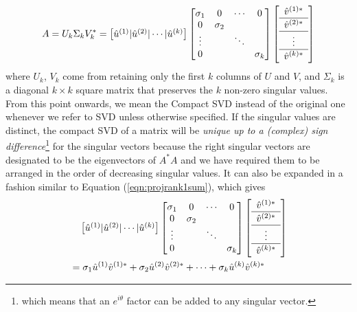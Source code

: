 \begin{align}
A = U_k\Sigma_k V_k^* = \begin{bmatrix}
\hat{u}^{(1)} | \hat{u}^{(2)} | \cdots | \hat{u}^{(k)}
\end{bmatrix}
\begin{bmatrix}
\sigma_1 & 0 & \cdots & 0 \\
0 & \sigma_2 & & \\
\vdots & & \ddots & \\
0 & & & \sigma_k
\end{bmatrix}
\left[\begin{array}{c} 
\hat{v}^{(1)*} \\
\hline
\hat{v}^{(2)*} \Tstrut \\
\hline
\vdots \\
\hline 
\hat{v}^{(k)*} \Tstrut 
\end{array}\right] 
\end{align}
where $U_k$, $V_k$ come from retaining only the first $k$ columns of $U$ and $V$, and $\Sigma_k$ is a diagonal $k \times k$ square matrix that preserves the $k$ non-zero singular values. From this point onwards, we mean the Compact SVD instead of the original one whenever we refer to SVD unless otherwise specified. If the singular values are distinct, the compact SVD of a matrix will be \textit{unique up to a (complex) sign difference}\footnote{which means that an $e^{i\theta}$ factor can be added to any singular vector.} for the singular vectors because the right singular vectors are designated to be the eigenvectors of $A^*A$ and we have required them to be arranged in the order of decreasing singular values. It can also be expanded in a fashion similar to Equation (\ref{eqn:projrank1sum}), which gives
\begin{align}
& \quad \begin{bmatrix}
\hat{u}^{(1)} | \hat{u}^{(2)} | \cdots | \hat{u}^{(k)}
\end{bmatrix}
\begin{bmatrix}
\sigma_1 & 0 & \cdots & 0 \\
0 & \sigma_2 & & \\
\vdots & & \ddots & \\
0 & & & \sigma_k
\end{bmatrix}
\left[\begin{array}{c} 
\hat{v}^{(1)*} \\
\hline
\hat{v}^{(2)*} \Tstrut \\
\hline
\vdots \\
\hline 
\hat{v}^{(k)*} \Tstrut 
\end{array}\right] \nonumber \\
&= \sigma_1\hat{u}^{(1)}\hat{v}^{(1)*} + \sigma_2\hat{u}^{(2)}\hat{v}^{(2)*} + \cdots + \sigma_k\hat{u}^{(k)}\hat{v}^{(k)*} 
\end{align}

